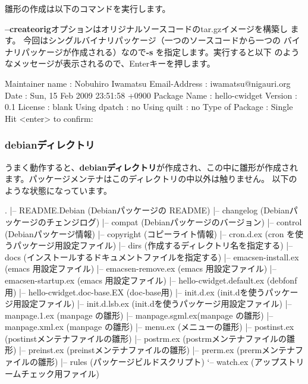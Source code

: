 \documentclass[mingoth,a4paper]{jsarticle}
\begin{document}
雛形の作成は以下のコマンドを実行します。
{\bf --createorig}オプションはオリジナルソースコードのtar.gzイメージを構築し
  ます。 今回はシングルバイナリパッケージ（一つのソースコードから一つの
  バイナリパッケージが作成される）なので{\bf -s} を指定します。実行すると以下
  のようなメッセージが表示されるので、Enterキーを押します。
\begin{commandline}
Maintainer name : Nobuhiro Iwamatsu
Email-Address   : iwamatsu@nigauri.org 
Date            : Sun, 15 Feb 2009 23:51:58 +0900
Package Name    : hello-cwidget
Version         : 0.1
License         : blank
Using dpatch    : no
Using quilt     : no
Type of Package : Single
Hit <enter> to confirm: 
\end{commandline}

\subsubsection{debianディレクトリ}
うまく動作すると、{\bf debianディレクトリ}が作成され、この中に雛形が作成され
ます。パッケージメンテナはこのディレクトリの中以外は触りません。
以下のような状態になっています。
\begin{commandline}
.
|-- README.Debian  (Debianパッケージの README)
|-- changelog      (Debianパッケージのチェンジログ)
|-- compat         (Debianパッケージのバージョン)
|-- control        (Debianパッケージ情報)
|-- copyright      (コピーライト情報)
|-- cron.d.ex      (cron を使うパッケージ用設定ファイル)
|-- dirs           (作成するディレクトリ名を指定する)
|-- docs           (インストールするドキュメントファイルを指定する)
|-- emacsen-install.ex (emacs 用設定ファイル)
|-- emacsen-remove.ex  (emacs 用設定ファイル)
|-- emacsen-startup.ex (emacs 用設定ファイル)
|-- hello-cwidget.default.ex (debfonf用)
|-- hello-cwidget.doc-base.EX (doc-base用)
|-- init.d.ex      (init.dを使うパッケージ用設定ファイル)
|-- init.d.lsb.ex  (init.dを使うパッケージ用設定ファイル)
|-- manpage.1.ex   (manpage の雛形)
|-- manpage.sgml.ex(manpage の雛形)
|-- manpage.xml.ex (manpage の雛形)
|-- menu.ex        (メニューの雛形)
|-- postinst.ex    (postinstメンテナファイルの雛形)
|-- postrm.ex      (postrmメンテナファイルの雛形)
|-- preinst.ex     (preinstメンテナファイルの雛形)
|-- prerm.ex       (prermメンテナファイルの雛形)
|-- rules          (パッケージビルドスクリプト)
`-- watch.ex       (アップストリームチェック用ファイル)
\end{commandline}
\end{document}

